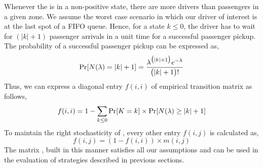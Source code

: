 Whenever the {\markovchain} is in a non-positive state, there are more drivers than passengers in a given zone. We assume the worst case scenario in which our driver of interest is at the last spot of a FIFO queue. Hence, for a state $k \leq 0$, the driver has to wait for $(|k| + 1)$ passenger arrivals in a unit time for a successful passenger pickup. The probability of a successful passenger pickup can be expressed as,
\begin{equation}
\Pr[N(\lambda) = |k| + 1] = \frac{\lambda^{\big(|k|+1\big)} e^{-\lambda}}{\big(|k| + 1\big)!}
\end{equation}
Thus, we can express a diagonal entry $f(i,i)$ of empirical transition matrix as follows,
\begin{equation}
f(i,i) = 1 - \sum_{k \leq 0} \Pr[K = k] \times \Pr[N(\lambda) \geq |k| + 1]
\end{equation}
To maintain the right stochasticity of {\empiricaltransitionmatrix}, every other entry $f(i,j)$ is calculated as,
\begin{equation}
f(i,j) = (1 - f(i,i)) \times m(i,j)
\end{equation}
The matrix {\empiricaltransitionmatrix}, built in this manner satisfies all our assumptions and can be used in the evaluation of strategies described in previous sections.





